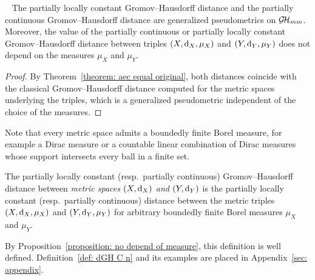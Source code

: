   \begin{proposition}~\label{proposition: no depend of measure}
    The partially locally constant Gromov--Hausdorff distance and the partially continuous Gromov--Hausdorff distance are generalized pseudometrics on $\operatorname{\mathcal{G\!H}}_{mm}$.
    Moreover, the value of the partially continuous or partially locally constant Gromov--Hausdorff distance between triples $(X, \operatorname{d}_{X}, \mu_{X})$ and $(Y, \operatorname{d}_{Y}, \mu_{Y})$ does not depend on the measures $\mu_{X}$ and $\mu_{Y}$.
  \end{proposition}
  \begin{proof}
    By Theorem~\ref{theorem: aec equal original}, both distances coincide with the classical Gromov--Hausdorff distance computed for the metric spaces underlying the triples, which is a generalized pseudometric independent of the choice of the measures.
  \end{proof}
  Note that every metric space admits a boundedly finite Borel measure, for example a Dirac measure or a countable linear combination of Dirac measures whose support intersects every ball in a finite set.
  \begin{define}
    The partially locally constant (resp.\ partially continuous) Gromov--Hausdorff distance between \emph{metric spaces $(X, \operatorname{d}_{X})$ and $(Y, \operatorname{d}_{Y})$} is the partially locally constant (resp.\ partially continuous) distance between the metric triples $(X, \operatorname{d}_{X}, \mu_{X})$ and $(Y, \operatorname{d}_{Y}, \mu_{Y})$ for arbitrary boundedly finite Borel measures $\mu_{X}$ and $\mu_{Y}$.
  \end{define}
  By Proposition~\ref{proposition: no depend of measure}, this definition is well defined. Definition~\ref{def: dGH C n} and its examples are placed in Appendix~\ref{sec: appendix}.
